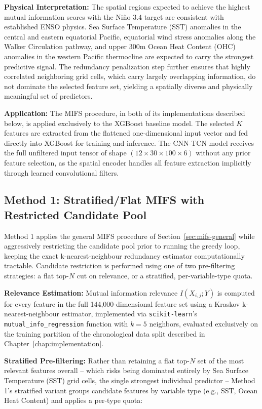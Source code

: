 \textbf{Physical Interpretation:} The spatial regions expected to achieve the highest mutual information scores with the Ni\~{n}o 3.4 target are consistent with established ENSO physics. Sea Surface Temperature (SST) anomalies in the central and eastern equatorial Pacific, equatorial wind stress anomalies along the Walker Circulation pathway, and upper 300m Ocean Heat Content (OHC) anomalies in the western Pacific thermocline are expected to carry the strongest predictive signal. The redundancy penalization step further ensures that highly correlated neighboring grid cells, which carry largely overlapping information, do not dominate the selected feature set, yielding a spatially diverse and physically meaningful set of predictors.

\textbf{Application:} The MIFS procedure, in both of its implementations described below, is applied exclusively to the XGBoost baseline model. The selected $K$ features are extracted from the flattened one-dimensional input vector and fed directly into XGBoost for training and inference. The CNN-TCN model receives the full unfiltered input tensor of shape $(12 \times 30 \times 100 \times 6)$ without any prior feature selection, as the spatial encoder handles all feature extraction implicitly through learned convolutional filters.

\subsection{Method 1: Stratified/Flat MIFS with Restricted Candidate Pool}
\label{sec:mifs-method1}

Method 1 applies the general MIFS procedure of Section~\ref{sec:mifs-general} while aggressively restricting the candidate pool prior to running the greedy loop, keeping the exact k-nearest-neighbour redundancy estimator computationally tractable. Candidate restriction is performed using one of two pre-filtering strategies: a flat top-$N$ cut on relevance, or a stratified, per-variable-type quota.

\textbf{Relevance Estimation:} Mutual information relevance $I(X_{i,j}; Y)$ is computed for every feature in the full 144,000-dimensional feature set using a Kraskov k-nearest-neighbour estimator, implemented via \texttt{scikit-learn}'s \texttt{mutual\_info\_regression} function with $k = 5$ neighbors, evaluated exclusively on the training partition of the chronological data split described in Chapter~\ref{chap:implementation}.

\textbf{Stratified Pre-filtering:} Rather than retaining a flat top-$N$ set of the most relevant features overall -- which risks being dominated entirely by Sea Surface Temperature (SST) grid cells, the single strongest individual predictor -- Method 1's stratified variant groups candidate features by variable type (e.g., SST, Ocean Heat Content) and applies a per-type quota:

